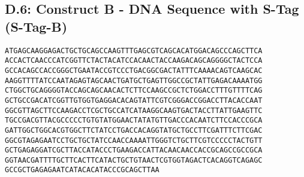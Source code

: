 \subsection*{D.6: Construct B - DNA Sequence with S-Tag (S-Tag-B)}
\begin{verbatim}
ATGAGCAAGGAGACTGCTGCAGCCAAGTTTGAGCGTCAGCACATGGACAGCCCAGCTTCA
ACCACTCAACCCATCGGTTCTACTACATCCACAACTACCAAGACAGCAGGGGCTACTCCA
GCCACAGCCACCGGGCTGAATACCGTCCCTGACGGCGACTATTTCAAAACAGTCAAGCAC
AAGGTTTTATCCAATAGAGTAGCAACTGATGCTGAGTTGGCCGCTATTGAGACAAAATGG
CTGGCTGCAGGGGTACCAGCAGCAACACTCTTCCAAGCCGCTCTGGACCTTTGTTTTCAG
GCTGCCGACATCGGTTGTGGTGAGGACACAGTATTCGTCGGGACCGGACCTTACACCAAT
GGCGTTAGCTTCCAAGACCTCGCTGCCATCATAAGGCAAGTGACTACCTTATTGAAGTTC
TGCCGACGTTACGCCCCCTGTGTATGGAACTATATGTTGACCCACAATCTTCCACCCGCA
GATTGGCTGGCACGTGGCTTCTATCCTGACCACAGGTATGCTGCCTTCGATTTCTTCGAC
GGCGTAGAGAATCCTGCTGCTATCCAACCAAAATTGGGTCTGCTTCGTCCCCCTACTGTT
GCTGAGAGGATCGCTTACCATACCCTGAAGACCATTACAACAACCACCGCAGCCGCCGCA
GGTAACGATTTTGCTTCACTTCATACTGCTGTAACTCGTGGTAGACTCACAGGTCAGAGC
GCCGCTGAGAGAATCATACACATACCCGCAGCTTAA
\end{verbatim}